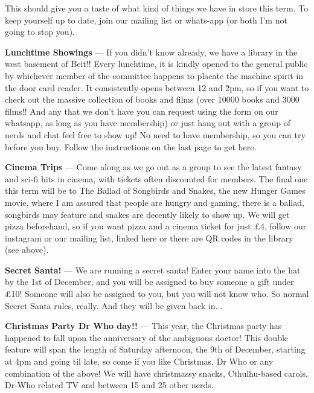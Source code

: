 This should give you a taste of what kind of things we have in store
this term. To keep yourself up to date, join our mailing list or whats-app (or both I'm not going to stop you).

\textbf{Lunchtime Showings} ---
If you didn't know already, we have a library in the west basement of Beit!! Every lunchtime, it is kindly opened to the general public by whichever member of the committee happens to placate the machine spirit in the door card reader. It consistently opens between 12 and 2pm, so if you want to check out the massive collection of books and films (over 10000 books and 3000 films!! And any that we don't have you can request using the form on our whatsapp, as long as you have membership) or just hang out with a group of nerds and chat feel free to show up! No need to have membership, so you can try before you buy. Follow the instructions on the last page to get here.

\textbf{Cinema Trips} ---
Come along as we go out as a group to see the latest fantasy and
sci-fi hits in cinema, with tickets often discounted for members. The final one this term will be to The Ballad of Songbirds and Snakes, the new Hunger Games movie, where I am assured that people are hungry and gaming, there is a ballad, songbirds may feature and snakes are decently likely to show up. We will get pizza beforehand, so if you want pizza and a cinema ticket for just £4, follow our instagram or our mailing list, linked here or there are QR codes in the library (see above).


\textbf{Secret Santa!} ---
We are running a secret santa! Enter your name into the hat by the 1st of December, and you will be assigned to buy someone a gift under £10! Someone will also be assigned to you, but you will not know who. So normal Secret Santa rules, really. And they will be given back in...


\textbf{Christmas Party Dr Who day!!} ---
This year, the Christmas party has happened to fall upon the anniversary of the ambiguous doctor! This double feature will span the length of Saturday afternoon, the 9th of December, starting at 4pm and going til late, so come if you like Christmas, Dr Who or any combination of the above! We will have christmassy snacks, Cthulhu-based carols, Dr-Who related TV and between 15 and 25 other nerds.

